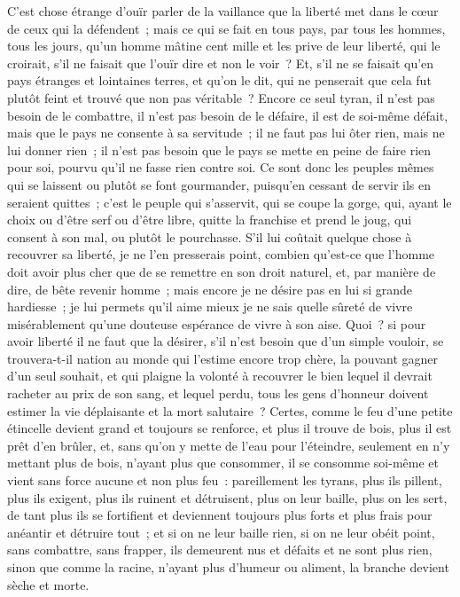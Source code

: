 \documentclass[french,twoside]{book} %
\begin{document}
C’est chose étrange d’ouïr parler de la vaillance que la liberté met dans le cœur de ceux qui la défendent ; mais ce qui se fait en tous pays, par tous les hommes, tous les jours, qu’un homme mâtine cent mille et les prive de leur liberté, qui le croirait, s’il ne faisait que l’ouïr dire et non le voir ? Et, s’il ne se faisait qu’en pays étranges et lointaines terres, et qu’on le dit, qui ne penserait que cela fut plutôt feint et trouvé que non pas véritable ? Encore ce seul tyran, il n’est pas besoin de le combattre, il n’est pas besoin de le défaire, il est de soi-même défait, mais que le pays ne consente à sa servitude ; il ne faut pas lui ôter rien, mais ne lui donner rien ; il n’est pas besoin que le pays se mette en peine de faire rien pour soi, pourvu qu’il ne fasse rien contre soi. Ce sont donc les peuples mêmes qui se laissent ou plutôt se font gourmander, puisqu’en cessant de servir ils en seraient quittes ; c’est le peuple qui s’asservit, qui se coupe la gorge, qui, ayant le choix ou d’être serf ou d’être libre, quitte la franchise et prend le joug, qui consent à son mal, ou plutôt le pourchasse. S’il lui coûtait quelque chose à recouvrer sa liberté, je ne l’en presserais point, combien qu’est-ce que l’homme doit avoir plus cher que de se remettre en son droit naturel, et, par manière de dire, de bête revenir homme ; mais encore je ne désire pas en lui si grande hardiesse ; je lui permets qu’il aime mieux je ne sais quelle sûreté de vivre misérablement qu’une douteuse espérance de vivre à son aise. Quoi ? si pour avoir liberté il ne faut que la désirer, s’il n’est besoin que d’un simple vouloir, se trouvera-t-il nation au monde qui l’estime encore trop chère, la pouvant gagner d’un seul souhait, et qui plaigne la volonté à recouvrer le bien lequel il devrait racheter au prix de son sang, et lequel perdu, tous les gens d’honneur doivent estimer la vie déplaisante et la mort salutaire ? Certes, comme le feu d’une petite étincelle devient grand et toujours se renforce, et plus il trouve de bois, plus il est prêt d’en brûler, et, sans qu’on y mette de l’eau pour l’éteindre, seulement en n’y mettant plus de bois, n’ayant plus que consommer, il se consomme soi-même et vient sans force aucune et non plus feu : pareillement les tyrans, plus ils pillent, plus ils exigent, plus ils ruinent et détruisent, plus on leur baille, plus on les sert, de tant plus ils se fortifient et deviennent toujours plus forts et plus frais pour anéantir et détruire tout ; et si on ne leur baille rien, si on ne leur obéit point, sans combattre, sans frapper, ils demeurent nus et défaits et ne sont plus rien, sinon que comme la racine, n’ayant plus d’humeur ou aliment, la branche devient sèche et morte.\par
\end{document}
